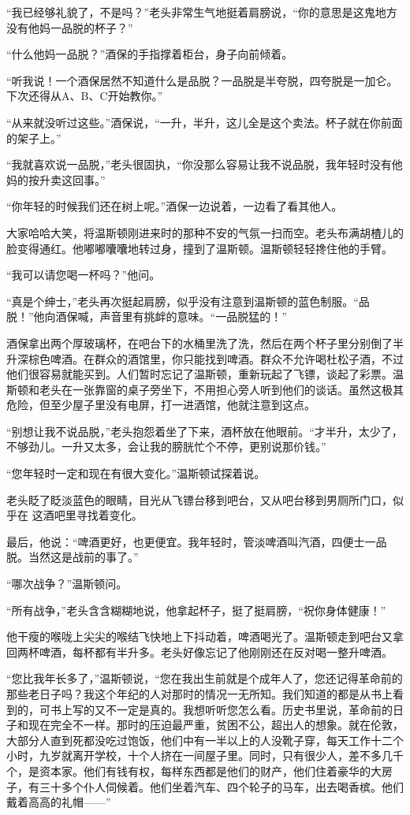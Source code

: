 ``我已经够礼貌了，不是吗？''老头非常生气地挺着肩膀说，``你的意思是这鬼地方没有他妈一品脱的杯子？''

``什么他妈一品脱？''酒保的手指撑着柜台，身子向前倾着。

``听我说！一个酒保居然不知道什么是品脱？一品脱是半夸脱，四夸脱是一加仑。下次还得从A、B、C开始教你。''

``从来就没听过这些。''酒保说，``一升，半升，这儿全是这个卖法。杯子就在你前面的架子上。''

``我就喜欢说一品脱，''老头很固执，``你没那么容易让我不说品脱，我年轻时没有他妈的按升卖这回事。''

``你年轻的时候我们还在树上呢。''酒保一边说着，一边看了看其他人。

大家哈哈大笑，将温斯顿刚进来时的那种不安的气氛一扫而空。老头布满胡楂儿的脸变得通红。他嘟嘟囔囔地转过身，撞到了温斯顿。温斯顿轻轻搀住他的手臂。

``我可以请您喝一杯吗？''他问。

``真是个绅士，''老头再次挺起肩膀，似乎没有注意到温斯顿的蓝色制服。``品脱！''他向酒保喊，声音里有挑衅的意味。``一品脱猛的！''

酒保拿出两个厚玻璃杯，在吧台下的水桶里洗了洗，然后在两个杯子里分别倒了半升深棕色啤酒。在群众的酒馆里，你只能找到啤酒。群众不允许喝杜松子酒，不过他们很容易就能买到。人们暂时忘记了温斯顿，重新玩起了飞镖，谈起了彩票。温斯顿和老头在一张靠窗的桌子旁坐下，不用担心旁人听到他们的谈话。虽然这极其危险，但至少屋子里没有电屏，打一进酒馆，他就注意到这点。

``别想让我不说品脱，''老头抱怨着坐了下来，酒杯放在他眼前。``才半升，太少了，不够劲儿。一升又太多，会让我的膀胱忙个不停，更别说那价钱。''

``您年轻时一定和现在有很大变化。''温斯顿试探着说。

老头眨了眨淡蓝色的眼睛，目光从飞镖台移到吧台，又从吧台移到男厕所门口，似乎在
这酒吧里寻找着变化。

最后，他说：``啤酒更好，也更便宜。我年轻时，管淡啤酒叫汽酒，四便士一品脱。当然这是战前的事了。''

``哪次战争？''温斯顿问。

``所有战争，''老头含含糊糊地说，他拿起杯子，挺了挺肩膀，``祝你身体健康！''

他干瘦的喉咙上尖尖的喉结飞快地上下抖动着，啤酒喝光了。温斯顿走到吧台又拿回两杯啤酒，每杯都有半升多。老头好像忘记了他刚刚还在反对喝一整升啤酒。

``您比我年长多了，''温斯顿说，``您在我出生前就是个成年人了，您还记得革命前的那些老日子吗？我这个年纪的人对那时的情况一无所知。我们知道的都是从书上看到的，可书上写的又不一定是真的。我想听听您怎么看。历史书里说，革命前的日子和现在完全不一样。那时的压迫最严重，贫困不公，超出人的想象。就在伦敦，大部分人直到死都没吃过饱饭，他们中有一半以上的人没靴子穿，每天工作十二个小时，九岁就离开学校，十个人挤在一间屋子里。同时，只有很少人，差不多几千个，是资本家。他们有钱有权，每样东西都是他们的财产，他们住着豪华的大房子，有三十多个仆人伺候着。他们坐着汽车、四个轮子的马车，出去喝香槟。他们戴着高高的礼帽——''

